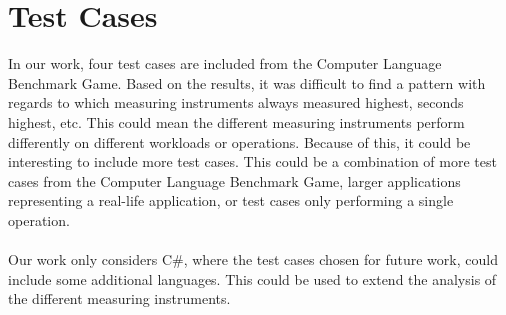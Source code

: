 \section{Test Cases}

In our work, four test cases are included from the Computer Language Benchmark Game. Based on the results, it was difficult to find a pattern with regards to which measuring instruments always measured highest, seconds highest, etc. This could mean the different measuring instruments perform differently on different workloads or operations. Because of this, it could be interesting to include more test cases. This could be a combination of more test cases from the Computer Language Benchmark Game, larger applications representing a real-life application, or test cases only performing a single operation.

\paragraph*{}
Our work only considers C\#, where the test cases chosen for future work, could include some additional languages. This could be used to extend the analysis of the different measuring instruments.